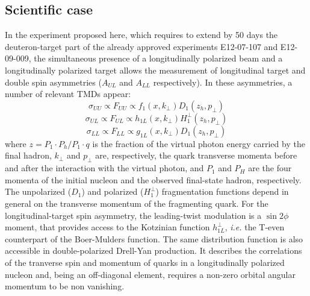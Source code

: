 \subsection{Scientific case}
%
In the experiment proposed here, which requires to extend by 50 days the deuteron-target part of the already approved experiments E12-07-107 and E12-09-009, the simultaneous presence of a longitudinally polarized beam and a longitudinally polarized target allows the measurement of longitudinal target and double spin asymmetries ($A_{UL}$ and $A_{LL}$ respectively). In these asymmetries, a number of relevant TMDs appear:
%
\begin{equation}
\sigma_{UU} \propto F_{UU} \propto f_1(x, k_\perp) D_1(z_h, p_\perp) 
\end{equation}
%
\begin{equation}
\sigma_{UL} \propto F_{UL} \propto h_{1L}(x, k_\perp) H^\perp_1(z_h, p_\perp) 
\end{equation}
%
\begin{equation}
\sigma_{LL} \propto F_{LL} \propto g_{1L}(x, k_\perp) D_1(z_h, p_\perp) 
\end{equation}
%
%
where $z=P_1\cdot P_h/P_1\cdot q$ is the fraction of the virtual photon energy carried by the final hadron, $k_\perp$ and $p_\perp$ are, respectively, the quark transverse momenta before and after the interaction with the virtual photon, and $P_1$ and $P_H$ are the four momenta of the initial nucleon and the observed final-state hadron, respectively. 
The unpolarized ($D_1$) and polarized ($H^\perp_1$) fragmentation functions depend in general on the transverse momentum of the fragmenting quark.
For the longitudinal-target spin asymmetry, the leading-twist modulation is a $\sin2\phi$ moment, that provides access to the Kotzinian function $h_{1 L}^{\perp}$, \textit{i.e.} the T-even counterpart of the Boer-Mulders function. 
The same distribution function is also accessible in double-polarized Drell-Yan production.
It describes the correlations of the tranverse spin and momentum of quarks in a longitudinally polarized nucleon and, being an off-diagonal element, requires a non-zero orbital angular momentum to be non vanishing.
%
